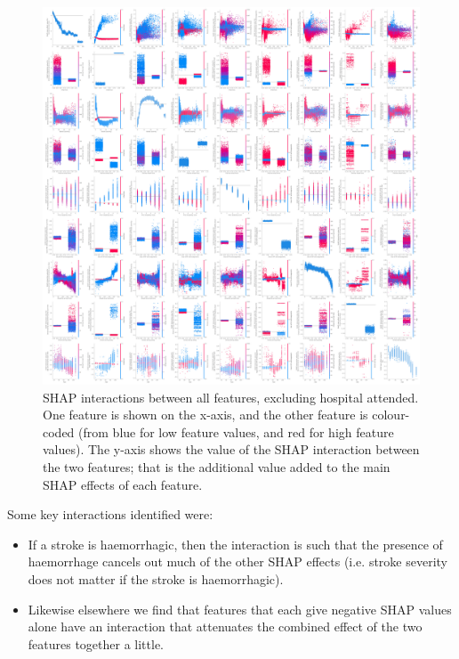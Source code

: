 \begin{figure}
\centering
\includegraphics[width=1.0\textwidth]{./images/12a_shap_interactions_scatter_small}
\caption{SHAP interactions between all features, excluding hospital attended. One feature is shown on the x-axis, and the other feature is colour-coded (from blue for low feature values, and red for high feature values). The y-axis shows the value of the SHAP interaction between the two features; that is the additional value added to the main SHAP effects of each feature.}
\label{fig:shap_interactions}
\end{figure}

Some key interactions identified were:

\begin{itemize}
    \item If a stroke is haemorrhagic, then the interaction is such that the presence of haemorrhage cancels out much of the other SHAP effects (i.e. stroke severity does not matter if the stroke is haemorrhagic).
    \item Likewise elsewhere we find that features that each give negative SHAP values alone have an interaction that attenuates the combined effect of the two features together a little.
\end{itemize}


